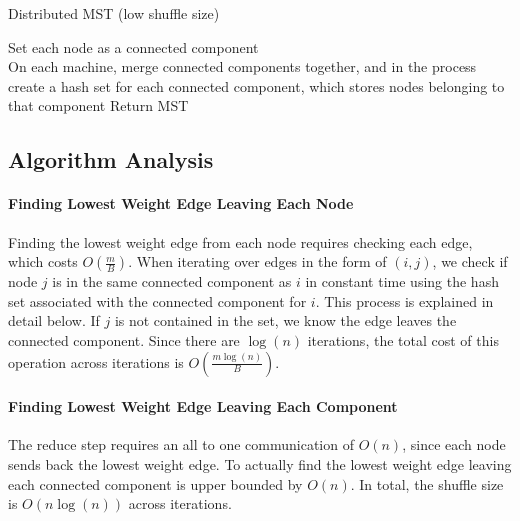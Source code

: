 \documentclass{article}
\begin{document}
\LinesNumbered
\begin{algorithm}[H]
\caption{Distributed MST (low shuffle size)}
Set each node as a connected component \\
 {
  On each machine, merge connected components together, and in the process create a hash set for each connected component, which stores nodes belonging to that component
}
Return MST
\end{algorithm}

\subsection*{Algorithm Analysis}

\paragraph{Finding Lowest Weight Edge Leaving Each Node}

Finding the lowest weight edge from each node requires checking each edge, which costs $O(\frac{m}{B})$. When iterating over edges in the form of $(i,j)$, we check if node $j$ is in the same connected component as $i$ in constant time using the hash set associated with the connected component for $i$. This process is explained in detail below. If $j$ is not contained in the set, we know the edge leaves the connected component. Since there are $\log(n)$ iterations, the total cost of this operation across iterations is $O(\frac{m \log(n)}{B})$.

\paragraph{Finding Lowest Weight Edge Leaving Each Component}

The reduce step requires an all to one communication of $O(n)$, since each node sends back the lowest weight edge. To actually find the lowest weight edge leaving each connected component is upper bounded by $O(n)$.  In total, the shuffle size is $O(n \log(n))$ across iterations.
\end{document}
